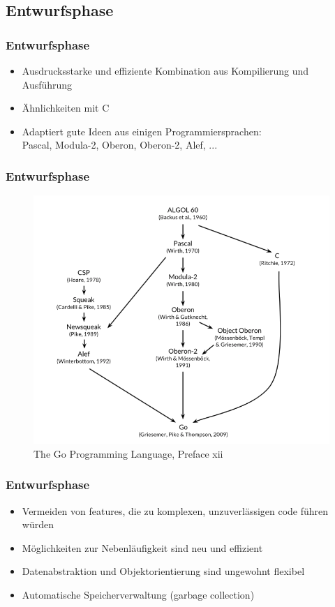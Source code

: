 \documentclass{beamer}
\begin{document}
\subsection{Entwurfsphase}
\begin{frame}
\frametitle{Entwurfsphase}

\begin{itemize}
\setlength{\itemsep}{40pt}
\item Ausdrucksstarke und effiziente Kombination aus Kompilierung und Ausf\"uhrung
\item Ähnlichkeiten mit C
\item Adaptiert gute Ideen aus einigen Programmiersprachen: \\
Pascal, Modula-2, Oberon, Oberon-2, Alef, ...
\end{itemize}

\end{frame}

\begin{frame}
\frametitle{Entwurfsphase}

\begin{figure}
\centering
\includegraphics[scale=0.45]{origin.png}
\caption{The Go Programming Language,  Preface xii}
\end{figure}

\end{frame}

\begin{frame}
\frametitle{Entwurfsphase}

\begin{itemize}
\setlength{\itemsep}{40pt}
\item Vermeiden von features, die zu komplexen, unzuverl\"assigen code führen w\"urden
\item M\"oglichkeiten zur Nebenl\"aufigkeit sind neu und effizient
\item Datenabstraktion und Objektorientierung sind ungewohnt flexibel
\item Automatische Speicherverwaltung (garbage collection)
\end{itemize}

\end{frame}
\end{document}

